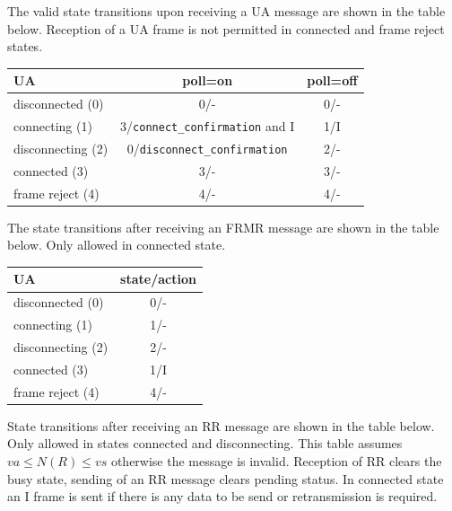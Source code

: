 \documentclass[a4paper]{article}
\begin{document}
The valid state transitions upon receiving a UA message are shown in the table below. Reception of a UA frame is not
permitted in connected and frame reject states.

{\footnotesize
\begin{center}
    \begin{tabular}{|l|c|c|}
        \hline
        UA                & poll=on                             & poll=off  \\
        \hline
        disconnected (0)  & 0/-                                 & 0/-       \\
        \hline
        connecting (1)    & 3/\verb!connect_confirmation! and I & 1/I       \\
        \hline
        disconnecting (2) & 0/\verb!disconnect_confirmation!       & 2/-       \\
        \hline
        connected (3)     & 3/-                                 & 3/-       \\
        \hline
        frame reject (4)  & 4/-                                 & 4/-       \\
        \hline
    \end{tabular}
\end{center}
}

The state transitions after receiving an FRMR message are shown in the table below. Only allowed in connected state.

{\footnotesize
\begin{center}
    \begin{tabular}{|l|c|}
        \hline
        UA                & state/action  \\
        \hline
        disconnected (0)  & 0/-           \\
        \hline
        connecting (1)    & 1/-           \\
        \hline
        disconnecting (2) & 2/-           \\
        \hline
        connected (3)     & 1/I           \\
        \hline
        frame reject (4)  & 4/-           \\
        \hline
    \end{tabular}
\end{center}
}

State transitions after receiving an RR message are shown in the table below. Only allowed in states connected and
disconnecting. This table assumes $va \leq N(R) \leq vs$ otherwise the message is invalid. Reception of RR clears the
busy state, sending of an RR message clears pending status. In connected state an I frame is sent if there is any data
to be send or retransmission is required.
\end{document}
